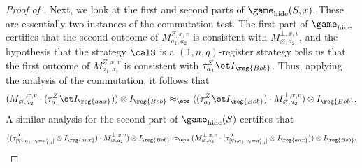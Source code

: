 \begin{proof}[Proof of ]
  Next, we look at the first and second parts of $\game_{\mathrm{hide}}(S,x)$. These are
  essentially two instances of the commutation test. The first part of
  $\game_{\mathrm{hide}}$ certifies that the second outcome of $M^{Z,
    x,v}_{a_1, a_2}$ is consistent with $M^{\bot, x,v}_{\varnothing,
    a_2}$, and the hypothesis that the strategy $\calS$ is a
  $(1,n,q)$-register strategy tells us that the first outcome of
  $M^{Z,x,v}_{a_1, a_2}$ is consistent with $\tau^Z_{a_1} \ot I_{\reg{Bob}}$. Thus,
  applying the analysis of the commutation, it follows that
  \[ (M^{\bot, x,v }_{\varnothing, a_2} \cdot (\tau^Z_{a_1} \ot I_{\reg{aux}})) \otimes I_{\reg{Bob}} \approx_{\eps}
    ((\tau^Z_{a_1} \ot I_{\reg{Bob}})\cdot M^{\bot, x,v}_{\varnothing, a_2}) \otimes I_{\reg{Bob}}. \]
  A similar analysis for the second part of $\game_{\mathrm{hide}}(S)$
  certifies that
\[
((\tau^{X}_{[\forall i, a_1 \cdot v_i = a'_{1,i}]} \otimes
I_{\reg{aux}})\cdot M_{\varnothing, a_2}^{\bot,x, v}) \otimes I_{\reg{Bob}}
\approx_{\eps} (M_{\varnothing, a_2}^{\bot, x, v} \cdot(\tau^{X}_{[\forall i, a_1 \cdot v_i = a'_{1,i}]} \otimes I_{\reg{aux}})) \otimes I_{\reg{Bob}}.
\]


\end{proof}
